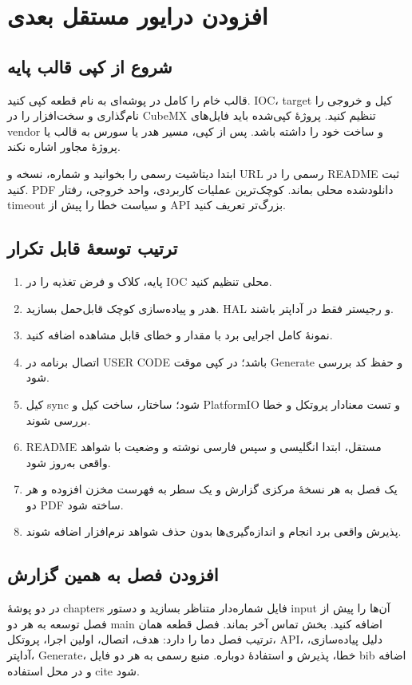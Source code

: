 \section{افزودن درایور مستقل بعدی}
\subsection{شروع از کپی قالب پایه}
قالب خام را کامل در پوشه‌ای به نام قطعه کپی کنید. IOC، target کیل و خروجی را نام‌گذاری و سخت‌افزار را در CubeMX تنظیم کنید. پروژهٔ کپی‌شده باید فایل‌های vendor و ساخت خود را داشته باشد. پس از کپی، مسیر هدر یا سورس به قالب یا پروژهٔ مجاور اشاره نکند.

ابتدا دیتاشیت رسمی را بخوانید و شماره، نسخه و URL رسمی را در README ثبت کنید. PDF دانلودشده محلی بماند. کوچک‌ترین عملیات کاربردی، واحد خروجی، رفتار timeout و سیاست خطا را پیش از API بزرگ‌تر تعریف کنید.

\subsection{ترتیب توسعهٔ قابل تکرار}
\begin{enumerate}
\item پایه، کلاک و فرض تغذیه را در IOC محلی تنظیم کنید.
\item هدر و پیاده‌سازی کوچک قابل‌حمل بسازید. HAL و رجیستر فقط در آداپتر باشند.
\item نمونهٔ کامل اجرایی برد با مقدار و خطای قابل مشاهده اضافه کنید.
\item اتصال برنامه در USER CODE باشد؛ در کپی موقت Generate و حفظ کد بررسی شود.
\item کیل sync شود؛ ساختار، ساخت کیل و PlatformIO و تست معنادار پروتکل و خطا بررسی شوند.
\item README مستقل، ابتدا انگلیسی و سپس فارسی نوشته و وضعیت با شواهد واقعی به‌روز شود.
\item یک فصل به هر نسخهٔ مرکزی گزارش و یک سطر به فهرست مخزن افزوده و هر دو PDF ساخته شود.
\item پذیرش واقعی برد انجام و اندازه‌گیری‌ها بدون حذف شواهد نرم‌افزار اضافه شوند.
\end{enumerate}

\subsection{افزودن فصل به همین گزارش}
در دو پوشهٔ chapters فایل شماره‌دار متناظر بسازید و دستور input آن‌ها را پیش از فصل توسعه به هر دو main اضافه کنید. بخش تماس آخر بماند. فصل قطعه همان ترتیب فصل دما را دارد: هدف، اتصال، اولین اجرا، پروتکل، API، دلیل پیاده‌سازی، آداپتر، Generate، خطا، پذیرش و استفادهٔ دوباره. منبع رسمی به هر دو فایل bib اضافه و در محل استفاده cite شود.


